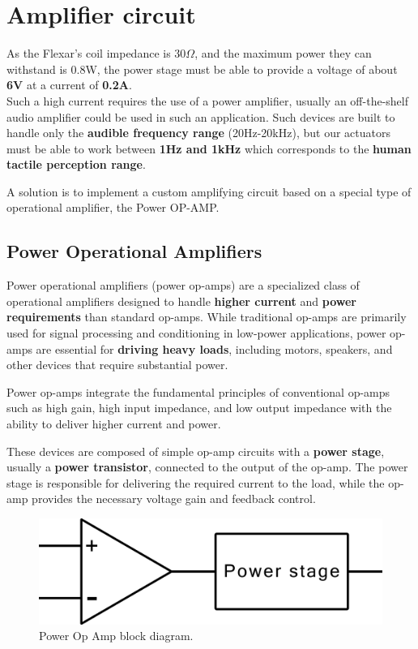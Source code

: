\section{Amplifier circuit}
As the Flexar's coil impedance is 30$\Omega$, and the maximum power they can withstand is 0.8W, the power stage must be able to provide a voltage of about \textbf{6V} at a current of \textbf{0.2A}. \\
Such a high current requires the use of a power amplifier, usually an off-the-shelf audio amplifier could be used in such an application.
Such devices are built to handle only the \textbf{audible frequency range} (20Hz-20kHz), but our actuators must be able to work between \textbf{1Hz and 1kHz} which corresponds to the \textbf{human tactile perception range}. 

A solution is to implement a custom amplifying circuit based on a special type of operational amplifier, the Power OP-AMP.

\subsection{Power Operational Amplifiers}
Power operational amplifiers (power op-amps) are a specialized class of operational amplifiers designed to handle \textbf{higher current} and \textbf{power requirements} than standard op-amps.
While traditional op-amps are primarily used for signal processing and conditioning in low-power applications, power op-amps are essential for \textbf{driving heavy loads}, including motors, speakers, and other devices that require substantial power.

Power op-amps integrate the fundamental principles of conventional op-amps such as high gain, high input impedance, and low output impedance with the ability to deliver higher current and power. 

\begin{samepage}
    These devices are composed of simple op-amp circuits with a \textbf{power stage}, usually a \textbf{power transistor}, connected to the output of the op-amp. The power stage is responsible for delivering the required current to the load, while the op-amp provides the necessary voltage gain and feedback control.
    \nopagebreak

    \begin{figure}[H]
        \centering
        \includegraphics[width=0.5\linewidth]{Chapters/Chapter4/Figures/power_op-amp_block_diagram.png}
        \caption{Power Op Amp block diagram.}
        \label{fig:Power_Op_Amp}
    \end{figure}
\end{samepage}


